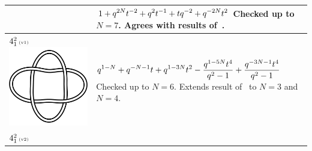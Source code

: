 \documentclass{compositio}
\theoremstyle{definition}
\numberwithin{equation}{section}
\begin{document}
{\begin{longtable}{p{}|p{}}
& 
$
\displaystyle{%
1 + q^{2 N} t^{-2} + q^2 t^{-1} + t q^{-2} + q^{-2 N} t^2
}
$
\newline\newline\newline\newline
Checked up to $N=7$. Agrees with results of~\cite{r0508510, r0607544}. 
\\
\hline
$4_{1}^2\,\text{{\tiny (v1)}}$ 
\includegraphics[scale=0.07,angle=0]{link4_1_2.pdf} 
& 
$
\displaystyle{%
q^{1-N}+q^{-N-1} t+q^{1-3 N} t^2-\frac{q^{1-5N} t^4}{q^2-1}+\frac{q^{-3 N-1} t^4}{q^2-1}
}
$
\newline\newline\newline\newline
Checked up to $N=6$. Extends result of~\cite{r0508510} to $N=3$ and $N=4$. 
\\
\hline
$4_{1}^2\,\text{{\tiny (v2)}}$ 

\end{longtable}}
\end{document}
